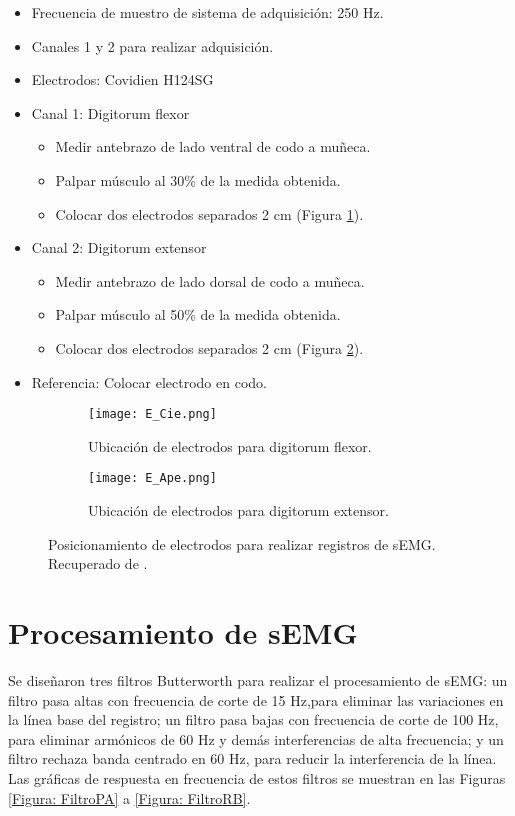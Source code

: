 \begin{itemize}
	\item Frecuencia de muestro de sistema de adquisición: 250 Hz.
	\item Canales 1 y 2 para realizar adquisición.
	\item Electrodos: Covidien H124SG
	\item Canal 1: Digitorum flexor
	\begin{itemize}
		\item Medir antebrazo de lado ventral de codo a muñeca.
		\item Palpar músculo al 30\% de la medida obtenida.
		\item Colocar dos electrodos separados 2 cm (Figura \ref{Figura: E_Cie}).
	\end{itemize}
	\item Canal 2: Digitorum extensor
	\begin{itemize}
		\item Medir antebrazo de lado dorsal de codo a muñeca.
		\item Palpar músculo al 50\% de la medida obtenida.
		\item Colocar dos electrodos separados 2 cm (Figura \ref{Figura: E_Ape}).
	\end{itemize}
	\item Referencia: Colocar electrodo en codo.
\end{itemize}

\begin{figure}[htbp]
	\centering
	\begin{subfigure}[htbp]{0.3\textwidth}
		\texttt{[image: E\_Cie.png]}
		\caption{Ubicación de electrodos para digitorum flexor.}
		\label{Figura: E_Cie}
	\end{subfigure}
	\hfill
	\begin{subfigure}[htbp]{0.3\textwidth}
		\texttt{[image: E\_Ape.png]}
		\caption{Ubicación de electrodos para digitorum extensor.}
		\label{Figura: E_Ape}
	\end{subfigure}
	\caption{Posicionamiento de electrodos para realizar registros de sEMG. Recuperado de \cite{Cavalcanti-Garcia2009}.}
	\label{Figura: E_sEMG}
\end{figure}

\section{Procesamiento de sEMG}

Se diseñaron tres filtros Butterworth para realizar el procesamiento de sEMG: un filtro pasa altas con frecuencia de corte de 15 Hz,para eliminar las variaciones en la línea base del registro; un filtro pasa bajas con frecuencia de corte de 100 Hz, para eliminar armónicos de 60 Hz y demás interferencias de alta frecuencia; y un filtro rechaza banda centrado en 60 Hz, para reducir la interferencia de la línea. Las gráficas de respuesta en frecuencia de estos filtros se muestran en las Figuras \ref{Figura: FiltroPA} a \ref{Figura: FiltroRB}.


